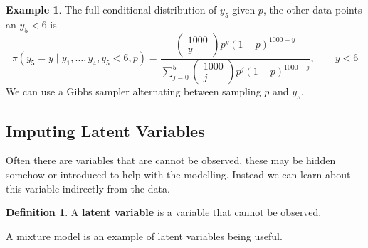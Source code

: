 \documentclass[
]{book}
\theoremstyle{definition}
\newtheorem{definition}{Definition}[chapter]
\theoremstyle{definition}
\newtheorem{example}{Example}[chapter]
\theoremstyle{definition}
\theoremstyle{definition}
\theoremstyle{remark}
\begin{document}
\begin{example}
The full conditional distribution of \(y_5\) given \(p\), the other data points an \(y_5 < 6\) is
\[
  \pi(y_5 = y \mid y_1, \ldots, y_4, y_5 < 6, p) = \frac{\begin{pmatrix} 1000 \\ y \end{pmatrix} p^{y}(1-p)^{1000 - y}}{\sum_{j=0}^{5}\begin{pmatrix} 1000 \\ j \end{pmatrix} p^{j}(1-p)^{1000-j}}, \qquad y < 6
\]
We can use a Gibbs sampler alternating between sampling \(p\) and \(y_5\).
\end{example}

\subsection{Imputing Latent Variables}\label{imputing-latent-variables}

Often there are variables that are cannot be observed, these may be hidden somehow or introduced to help with the modelling. Instead we can learn about this variable indirectly from the data.

\begin{definition}
A \textbf{latent variable} is a variable that cannot be observed.
\end{definition}

A mixture model is an example of latent variables being useful.
\end{document}
